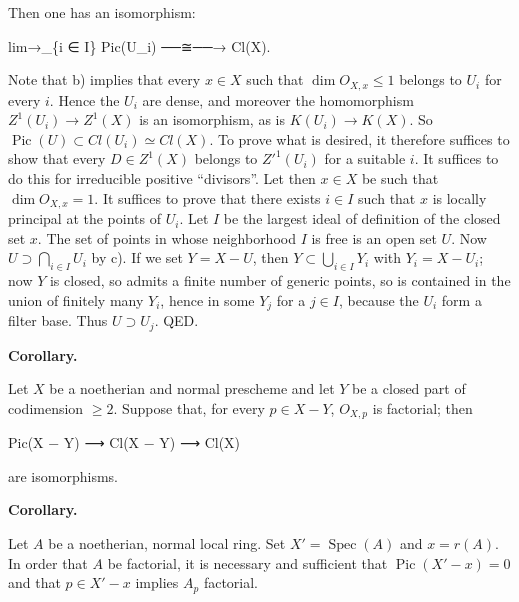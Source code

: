 \documentclass[
  11pt,
  a4paper,
]{book}
\newenvironment{Shaded}{}{}
\newcommand{\NormalTok}[1]{#1}
\begin{document}
Then one has an isomorphism:

\begin{Shaded}
\begin{Highlighting}[]
\NormalTok{lim→\_\{i ∈ I\} Pic(U\_i) ──≅──→ Cl(X).}
\end{Highlighting}
\end{Shaded}

Note that b) implies that every \(x \in X\) such that
\(\dim O_{X,x} \leqslant 1\) belongs to \(U_{i}\) for every \(i\). Hence
the \(U_{i}\) are dense, and moreover the homomorphism
\(Z^{1}(U_{i}) \to Z^{1}(X)\) is an isomorphism, as is \(K(U_{i}) \to
K(X)\). So \(\operatorname{Pic}(U) \subset Cl(U_{i}) \simeq Cl(X)\). To
prove what is desired, it therefore suffices to show that every
\(D \in Z^{1}(X)\) belongs to \(Z'^{1}(U_{i})\) for a suitable \(i\). It
suffices to do this for irreducible positive ``divisors''. Let then
\(x \in X\) be such that \(\dim O_{X,x} = 1\). It suffices to prove that
there exists \(i \in
I\) such that \({x}\) is locally principal at the points of \(U_{i}\).
Let \(I\) be the largest ideal of definition of the closed set \({x}\).
The set of points in whose neighborhood \(I\) is free is an open set
\(U\). Now \(U \supset \bigcap_{i \in
I} U_{i}\) by c). If we set \(Y = X - U\), then
\(Y \subset \bigcup_{i \in I} Y_{i}\) with \(Y_{i} = X - U_{i}\); now
\(Y\) is closed, so admits a finite number of generic points, so is
contained in the union of finitely many \(Y_{i}\), hence in some
\(Y_{j}\) for a \(j \in I\), because the \(U_{i}\) form a filter base.
Thus \(U \supset U_{j}\). QED.

\textbf{Corollary.}

Let \(X\) be a noetherian and normal prescheme and let \(Y\) be a closed
part of codimension \(\geqslant 2\). Suppose that, for every
\(p \in X - Y\), \(O_{X,p}\) is factorial; then

\begin{Shaded}
\begin{Highlighting}[]
\NormalTok{Pic(X − Y) ⟶ Cl(X − Y) ⟶ Cl(X)}
\end{Highlighting}
\end{Shaded}

are isomorphisms.

\textbf{Corollary.}

Let \(A\) be a noetherian, normal local ring. Set
\(X' = \operatorname{Spec}(A)\) and \(x = r(A)\). In order that \(A\) be
factorial, it is necessary and sufficient that
\(\operatorname{Pic}(X' - {x}) = 0\) and that \(p \in X' - {x}\) implies
\(A_{p}\) factorial.
\end{document}
